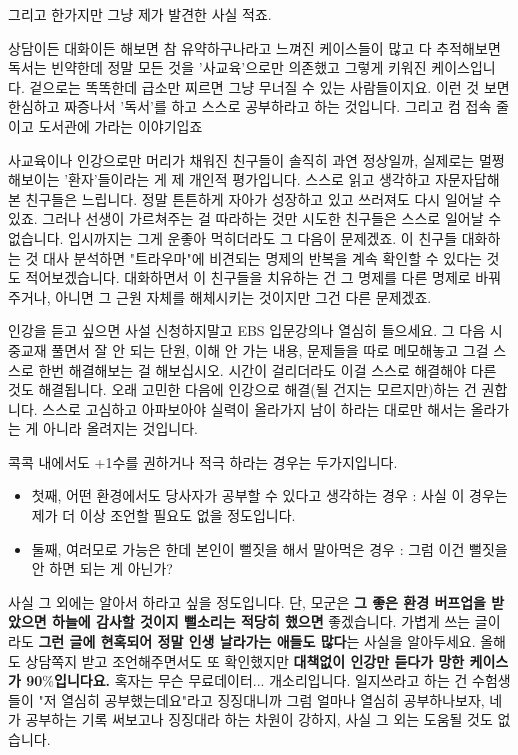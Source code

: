 그리고 한가지만 그냥 제가 발견한 사실 적죠.
\vspace{5mm}

상담이든 대화이든 해보면 참 유약하구나라고 느껴진 케이스들이 많고 다 추적해보면
독서는 빈약한데 정말 모든 것을 '사교육'으로만 의존했고 그렇게 키워진 케이스입니다.
겉으로는 똑똑한데 급소만 찌르면 그냥 무너질 수 있는 사람들이지요.
이런 것 보면 한심하고 짜증나서 '독서'를 하고 스스로 공부하라고 하는 것입니다.
그리고 컴 접속 줄이고 도서관에 가라는 이야기입죠
\vspace{5mm}

사교육이나 인강으로만 머리가 채워진 친구들이 솔직히 과연 정상일까, 실제로는 멀쩡해보이는 '환자'들이라는 게 제 개인적 평가입니다.
스스로 읽고 생각하고 자문자답해본 친구들은 느립니다. 정말 튼튼하게 자아가 성장하고 있고 쓰러져도 다시 일어날 수 있죠.
그러나 선생이 가르쳐주는 걸 따라하는 것만 시도한 친구들은 스스로 일어날 수 없습니다. 입시까지는 그게 운좋아 먹히더라도 그 다음이 문제겠죠.
이 친구들 대화하는 것 대사 분석하면 "트라우마"에 비견되는 명제의 반복을 계속 확인할 수 있다는 것도 적어보겠습니다.
대화하면서 이 친구들을 치유하는 건 그 명제를 다른 명제로 바꿔주거나, 아니면 그 근원 자체를 해체시키는 것이지만 그건 다른 문제겠죠.
\vspace{5mm}

인강을 듣고 싶으면 사설 신청하지말고 EBS 입문강의나 열심히 들으세요.
그 다음 시중교재 풀면서 잘 안 되는 단원, 이해 안 가는 내용, 문제들을 따로 메모해놓고
그걸 스스로 한번 해결해보는 걸 해보십시오. 시간이 걸리더라도 이걸 스스로 해결해야 다른 것도 해결됩니다.
오래 고민한 다음에 인강으로 해결(될 건지는 모르지만)하는 건 권합니다. 스스로 고심하고 아파보아야 실력이 올라가지
남이 하라는 대로만 해서는 올라가는 게 아니라 올려지는 것입니다.
\vspace{5mm}

콕콕 내에서도 +1수를 권하거나 적극 하라는 경우는 두가지입니다.
\begin{itemize}
    \item 첫째, 어떤 환경에서도 당사자가 공부할 수 있다고 생각하는 경우 : 사실 이 경우는 제가 더 이상 조언할 필요도 없을 정도입니다.
    \item 둘째, 여러모로 가능은 한데 본인이 뻘짓을 해서 말아먹은 경우 : 그럼 이건 뻘짓을 안 하면 되는 게 아닌가?
\end{itemize}
\vspace{5mm}

사실 그 외에는 알아서 하라고 싶을 정도입니다.
단, 모군은 \textbf{그 좋은 환경 버프업을 받았으면 하늘에 감사할 것이지 뻘소리는 적당히 했으면} 좋겠습니다.
가볍게 쓰는 글이라도 \textbf{그런 글에 현혹되어 정말 인생 날라가는 애들도 많다}는 사실을 알아두세요.
올해도 상담쪽지 받고 조언해주면서도 또 확인했지만 \textbf{대책없이 인강만 듣다가 망한 케이스가 90$\%$입니다요.}
혹자는 무슨 무료데이터... 개소리입니다. 일지쓰라고 하는 건 수험생들이 "저 열심히 공부했는데요"라고 징징대니까
그럼 얼마나 열심히 공부하나보자, 네가 공부하는 기록 써보고나 징징대라 하는 차원이 강하지, 사실 그 외는 도움될 것도 없습니다.
\vspace{5mm}

